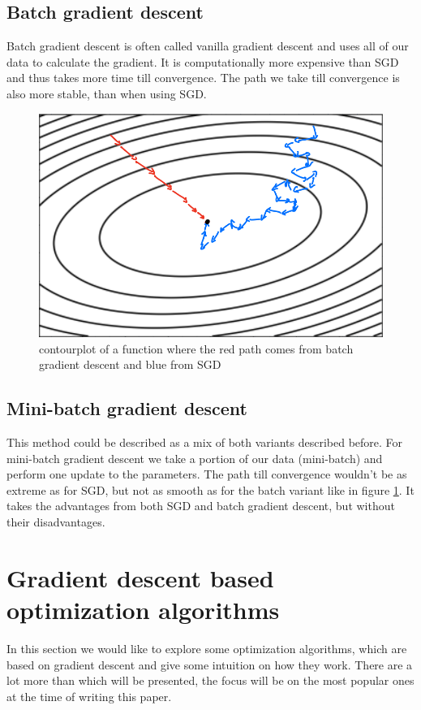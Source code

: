 \documentclass[aodsor,preprint]{imsart}
\numberwithin{equation}{section}
\theoremstyle{plain}
\begin{document}
\subsection{Batch gradient descent}
Batch gradient descent is often called vanilla gradient descent and uses all of our data to calculate the gradient. It is computationally more expensive than SGD and thus takes more time till convergence. The path we take till convergence is also more stable, than when using SGD.

\begin{figure}[htb]
\centering
\includegraphics[scale=0.3]{images/contour.png}
\caption{contourplot of a function where the red path comes from batch gradient descent and blue from SGD}
\label{fig:contour}
\end{figure}

\subsection{Mini-batch gradient descent}
This method could be described as a mix of both variants described before. For mini-batch gradient descent we take a portion of our data (mini-batch) and perform one update to the parameters. The path till convergence wouldn't be as extreme as for SGD, but not as smooth as for the batch variant like in figure \ref{fig:contour}. It takes the advantages from both SGD and batch gradient descent, but without their disadvantages.

\section{Gradient descent based optimization algorithms}
In this section we would like to explore some optimization algorithms, which are based on gradient descent and give some intuition on how they work. There are a lot more than which will be presented, the focus will be on the most popular ones at the time of writing this paper.
\end{document}

